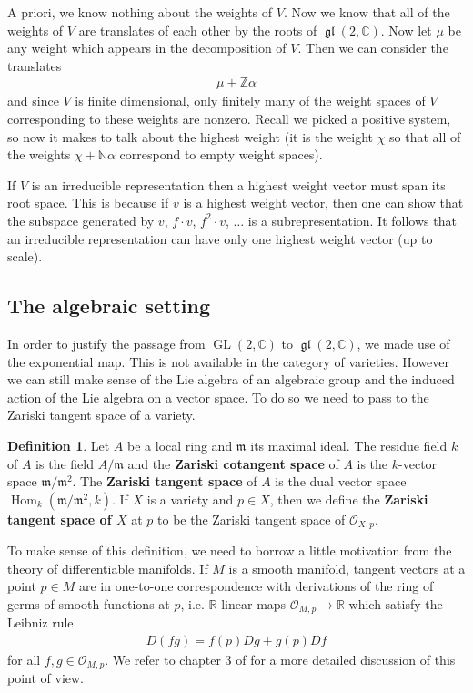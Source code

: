 \documentclass[manuscript, printscheme]{aomart}
\theoremstyle{plain} %
\theoremstyle{definition}
\newtheorem{definition}[equation]{Definition}
\theoremstyle{remark}
\newcommand{\cO}{{\mathcal{O}}}
\DeclareMathOperator{\Hom}{Hom}
\DeclareMathOperator{\GL}{GL}
\newcommand{\C}{\mathbb{C}}
\newcommand{\N}{\mathbb{N}}
\newcommand{\R}{\mathbb{R}}
\newcommand{\Z}{\mathbb{Z}}
\newcommand{\mf}[1]{\mathfrak{#1}}
\DeclareMathOperator{\gl}{\mf{gl}}
\begin{document}
A priori, we know nothing about the weights of $V$. Now we know that all of the weights of $V$ are translates of each other by the roots of
$\gl(2,\C)$. Now let $\mu$ be any weight which appears in the decomposition of $V$. Then we can consider the translates \begin{align*}
	\mu + \Z\alpha
\end{align*} and since $V$ is finite dimensional, only finitely many of the weight spaces of $V$ corresponding to these weights are nonzero.
Recall we picked a positive system, so now it makes to talk about the highest weight (it is the weight $\chi$ so that all of the weights $\chi + \N\alpha$
correspond to empty weight spaces).

\hfill

If $V$ is an irreducible representation then a highest weight vector must span its root space. This is because
if $v$ is a highest weight vector, then one can show that the subspace generated by $v$, $f\cdot v$, $f^2\cdot v$, $\ldots$ is a subrepresentation.
It follows that an irreducible representation can have only one highest weight vector (up to scale).

\subsection{The algebraic setting}
In order to justify the passage from $\GL(2,\C)$ to $\gl(2,\C)$, we made use of the exponential map.
This is not available in the category of varieties. However we can still make sense of the Lie algebra of an algebraic group
and the induced action of the Lie algebra on a vector space.
To do so we need to pass to the Zariski tangent space of a variety.

\begin{definition}
	Let $A$ be a local ring and $\mf m$ its maximal ideal. The residue field $k$ of $A$ is the field $A/\mf m$ and
	the \textbf{Zariski cotangent space} of $A$ is the $k$-vector space $\mf m/\mf m^2$. The
	\textbf{Zariski tangent space} of $A$ is the dual vector space $\Hom_k(\mf m/\mf m^2,k)$.
	If $X$ is a variety and $p\in X$, then we define the \textbf{ Zariski tangent space of $X$ }at $p$
	to be the Zariski tangent space of $\cO_{X,p}$.
\end{definition}


To make sense of this definition, we need to borrow a little motivation from the theory of differentiable manifolds.
If $M$ is a smooth manifold, tangent vectors at a point $p\in M$ are in one-to-one correspondence
with derivations of the ring of germs of smooth functions at $p$, i.e. $\R$-linear maps $\cO_{M,p}\to \R$ which satisfy the Leibniz rule
\begin{align*}
	D(fg) = f(p)Dg + g(p)Df
\end{align*} for all $f,g\in \cO_{M,p}$. 
We refer to chapter 3 of \cite{lee} for a more detailed discussion of this point of view.
\end{document}
